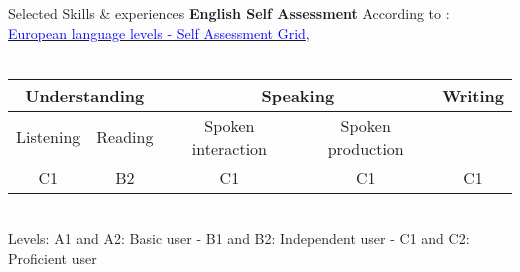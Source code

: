\documentclass{resume} %
\begin{document}
\begin{rSection}{ Selected Skills \& experiences}
		\textbf{English Self Assessment} According to : \href{https://europass.cedefop.europa.eu/resources/european-language-levels-cefr}{\textcolor{blue}{European language levels - Self Assessment Grid}},\\\\
\begin{tabular}{@{}|c|c|c|c|c@{}}
	\toprule
	\multicolumn{2}{|c|}{Understanding} & \multicolumn{2}{c|}{Speaking}          & Writing                 \\ \midrule
	Listening         & Reading         & Spoken interaction & Spoken production & \multicolumn{1}{c|}{}   \\ \midrule
	C1                & B2              & C1                 & C1                & \multicolumn{1}{c|}{C1} \\ \bottomrule
\end{tabular}
\\\tiny Levels: A1 and A2: Basic user - B1 and B2: Independent user - C1 and C2: Proficient user \normalfont \\ 
\end{rSection}
\end{document}
